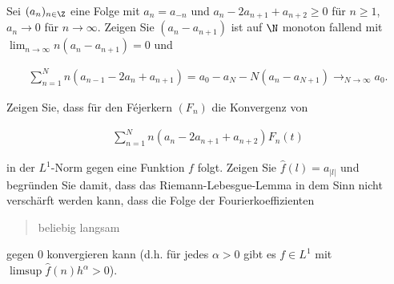 
\begin{exercise}

Sei $(a_n)_{n \in \Z}$ eine Folge mit $a_n = a_{-n}$ und $a_n - 2 a_{n+1} + a_{n+2} \geq 0$ für $n \geq 1$, $a_n \to 0$ für $n \to \infty$.
Zeigen Sie $(a_n - a_{n+1})$ ist auf $\N$ monoton fallend mit $\lim_{n \to \infty} n (a_n - a_{n+1}) = 0$ und

\begin{align} \label{eq:1}
    \sum_{n=1}^N
    n (a_{n-1} - 2 a_n + a_{n+1})
    =
    a_0 - a_N - N (a_n - a_{N+1})
    \to_{N \to \infty}
    a_0.
\end{align}

Zeigen Sie, dass für den Féjerkern $(F_n)$ die Konvergenz von

\begin{align} \label{eq:2}
    \sum_{n=1}^N
    n (a_n - 2 a_{n+1} + a_{n+2}) F_n(t)
\end{align}

in der $L^1$-Norm gegen eine Funktion $f$ folgt.
Zeigen Sie $\hat f(l) = a_{|l|}$ und begründen Sie damit, dass das Riemann-Lebesgue-Lemma in dem Sinn nicht verschärft werden kann, dass die Folge der Fourierkoeffizienten \blockquote{beliebig langsam} gegen $0$ konvergieren kann (d.h. für jedes $\alpha > 0$ gibt es $f \in L^1$ mit $\limsup \hat f(n) h^\alpha > 0$).

\end{exercise}


